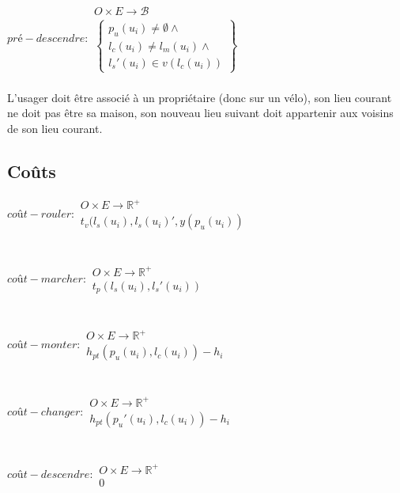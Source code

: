 \documentclass[french]{article}
\begin{document}
\vspace*{0.5cm}
\\
$\displaystyle pré-descendre:\begin{matrix}
O\times E\rightarrow \mathcal{B}\\
\begin{Bmatrix}
p_{u}( u_{i}) \neq \emptyset \land \\
l_{c}( u_{i}) \neq l_{m}( u_{i}) \land \\
l_{s} '( u_{i}) \in v( l_{c}( u_{i}))
\end{Bmatrix}
\end{matrix}$\\
\\
L'usager doit être associé à un propriétaire (donc sur un vélo), son lieu courant ne doit pas être sa maison, son nouveau lieu suivant doit appartenir aux voisins de son lieu courant.\\

\subsection{Coûts}
\noindent
$\displaystyle coût-rouler:\begin{matrix}
O\times E\rightarrow \mathbb{R}^{+}\\
t_{v}( l_{s}(u_{i}) ,l_{s}(u_{i}) ',y( p_{u}( u_{i}))
\end{matrix}$\\\\\\
$\displaystyle coût-marcher:\begin{matrix}
O\times E\rightarrow \mathbb{R}^{+}\\
t_{p}( l_{s}( u_{i}) ,l_{s} '( u_{i}))
\end{matrix}$\\\\\\
$\displaystyle coût-monter:\begin{matrix}
O\times E\rightarrow \mathbb{R}^{+}\\
h_{pt}( p_{u}( u_{i}) ,l_{c}( u_{i})) -h_{i}
\end{matrix}$\\\\\\
$\displaystyle coût-changer:\begin{matrix}
O\times E\rightarrow \mathbb{R}^{+}\\
h_{pt}( p_{u} '( u_{i}) ,l_{c}( u_{i})) -h_{i}
\end{matrix}$\\\\\\
$\displaystyle coût-descendre:\begin{matrix}
O\times E\rightarrow \mathbb{R}^{+}\\
0
\end{matrix}$\\
\end{document}
